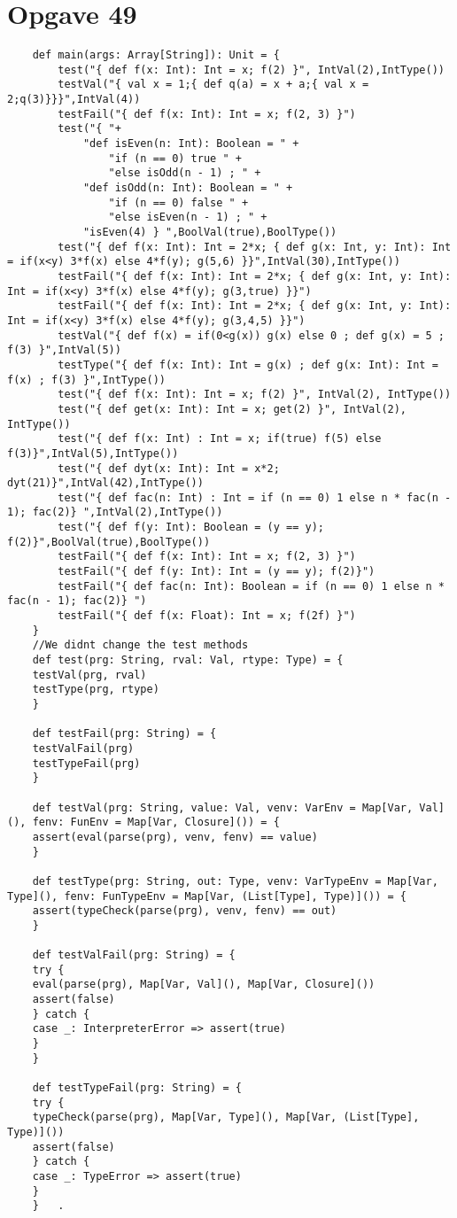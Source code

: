 \documentclass[a4paper, 10pt]{article}
\theoremstyle{remark}
\begin{document}
	\section*{Opgave 49}
	\begin{lstlisting}
	def main(args: Array[String]): Unit = {
		test("{ def f(x: Int): Int = x; f(2) }", IntVal(2),IntType())
		testVal("{ val x = 1;{ def q(a) = x + a;{ val x = 2;q(3)}}}",IntVal(4))
		testFail("{ def f(x: Int): Int = x; f(2, 3) }")
		test("{ "+
			"def isEven(n: Int): Boolean = " +
				"if (n == 0) true " +
				"else isOdd(n - 1) ; " +
			"def isOdd(n: Int): Boolean = " +
				"if (n == 0) false " +
				"else isEven(n - 1) ; " +
			"isEven(4) } ",BoolVal(true),BoolType())
		test("{ def f(x: Int): Int = 2*x; { def g(x: Int, y: Int): Int = if(x<y) 3*f(x) else 4*f(y); g(5,6) }}",IntVal(30),IntType())
		testFail("{ def f(x: Int): Int = 2*x; { def g(x: Int, y: Int): Int = if(x<y) 3*f(x) else 4*f(y); g(3,true) }}")
		testFail("{ def f(x: Int): Int = 2*x; { def g(x: Int, y: Int): Int = if(x<y) 3*f(x) else 4*f(y); g(3,4,5) }}")
		testVal("{ def f(x) = if(0<g(x)) g(x) else 0 ; def g(x) = 5 ; f(3) }",IntVal(5))
		testType("{ def f(x: Int): Int = g(x) ; def g(x: Int): Int = f(x) ; f(3) }",IntType())
		test("{ def f(x: Int): Int = x; f(2) }", IntVal(2), IntType())
		test("{ def get(x: Int): Int = x; get(2) }", IntVal(2), IntType())
		test("{ def f(x: Int) : Int = x; if(true) f(5) else f(3)}",IntVal(5),IntType())
		test("{ def dyt(x: Int): Int = x*2; dyt(21)}",IntVal(42),IntType())
		test("{ def fac(n: Int) : Int = if (n == 0) 1 else n * fac(n - 1); fac(2)} ",IntVal(2),IntType())
		test("{ def f(y: Int): Boolean = (y == y); f(2)}",BoolVal(true),BoolType())
		testFail("{ def f(x: Int): Int = x; f(2, 3) }")
		testFail("{ def f(y: Int): Int = (y == y); f(2)}")
		testFail("{ def fac(n: Int): Boolean = if (n == 0) 1 else n * fac(n - 1); fac(2)} ")
		testFail("{ def f(x: Float): Int = x; f(2f) }")
	}
	//We didnt change the test methods
	def test(prg: String, rval: Val, rtype: Type) = {
	testVal(prg, rval)
	testType(prg, rtype)
	}
	
	def testFail(prg: String) = {
	testValFail(prg)
	testTypeFail(prg)
	}
	
	def testVal(prg: String, value: Val, venv: VarEnv = Map[Var, Val](), fenv: FunEnv = Map[Var, Closure]()) = {
	assert(eval(parse(prg), venv, fenv) == value)
	}
	
	def testType(prg: String, out: Type, venv: VarTypeEnv = Map[Var, Type](), fenv: FunTypeEnv = Map[Var, (List[Type], Type)]()) = {
	assert(typeCheck(parse(prg), venv, fenv) == out)
	}
	
	def testValFail(prg: String) = {
	try {
	eval(parse(prg), Map[Var, Val](), Map[Var, Closure]())
	assert(false)
	} catch {
	case _: InterpreterError => assert(true)
	}
	}
	
	def testTypeFail(prg: String) = {
	try {
	typeCheck(parse(prg), Map[Var, Type](), Map[Var, (List[Type], Type)]())
	assert(false)
	} catch {
	case _: TypeError => assert(true)
	}
	}	.
	\end{lstlisting}
\end{document}

